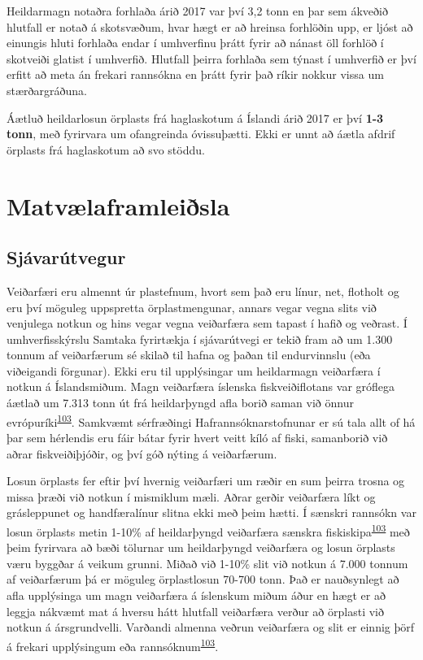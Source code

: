 \documentclass[icelandic,]{book}
\begin{document}
Heildarmagn notaðra forhlaða árið 2017 var því 3,2 tonn en þar sem ákveðið hlutfall er notað á skotsvæðum, hvar hægt er að hreinsa forhlöðin upp, er ljóst að einungis hluti forhlaða endar í umhverfinu þrátt fyrir að nánast öll forhlöð í skotveiði glatist í umhverfið. Hlutfall þeirra forhlaða sem týnast í umhverfið er því erfitt að meta án frekari rannsókna en þrátt fyrir það ríkir nokkur vissa um stærðargráðuna.

Áætluð heildarlosun örplasts frá haglaskotum á Íslandi árið 2017 er því \textbf{1-3 tonn}, með fyrirvara um ofangreinda óvissuþætti. Ekki er unnt að áætla afdrif örplasts frá haglaskotum að svo stöddu.

\hypertarget{matvlaframleisla}{%
\section*{Matvælaframleiðsla}\label{matvlaframleisla}}

\hypertarget{sjavarutvegur}{%
\subsection*{Sjávarútvegur}\label{sjavarutvegur}}

Veiðarfæri eru almennt úr plastefnum, hvort sem það eru línur, net, flotholt og eru því möguleg uppspretta örplastmengunar, annars vegar vegna slits við venjulega notkun og hins vegar vegna veiðarfæra sem tapast í hafið og veðrast. Í umhverfisskýrslu Samtaka fyrirtækja í sjávarútvegi er tekið fram að um 1.300 tonnum af veiðarfærum sé skilað til hafna og þaðan til endurvinnslu (eða viðeigandi förgunar). Ekki eru til upplýsingar um heildarmagn veiðarfæra í notkun á Íslandsmiðum. Magn veiðarfæra íslenska fiskveiðiflotans var gróflega áætlað um 7.313 tonn út frá heildarþyngd afla borið saman við önnur evrópuríki\textsuperscript{\protect\hyperlink{ref-Hann2018}{103}}. Samkvæmt sérfræðingi Hafrannsóknarstofnunar er sú tala allt of há þar sem hérlendis eru fáir bátar fyrir hvert veitt kíló af fiski, samanborið við aðrar fiskveiðiþjóðir, og því góð nýting á veiðarfærum.

Losun örplasts fer eftir því hvernig veiðarfæri um ræðir en sum þeirra trosna og missa þræði við notkun í mismiklum mæli. Aðrar gerðir veiðarfæra líkt og grásleppunet og handfæralínur slitna ekki með þeim hætti. Í sænskri rannsókn var losun örplasts metin 1-10\% af heildarþyngd veiðarfæra sænskra fiskiskipa\textsuperscript{\protect\hyperlink{ref-Hann2018}{103}} með þeim fyrirvara að bæði tölurnar um heildarþyngd veiðarfæra og losun örplasts væru byggðar á veikum grunni. Miðað við 1-10\% slit við notkun á 7.000 tonnum af veiðarfærum þá er möguleg örplastlosun 70-700 tonn. Það er nauðsynlegt að afla upplýsinga um magn veiðarfæra á íslenskum miðum áður en hægt er að leggja nákvæmt mat á hversu hátt hlutfall veiðarfæra verður að örplasti við notkun á ársgrundvelli. Varðandi almenna veðrun veiðarfæra og slit er einnig þörf á frekari upplýsingum eða rannsóknum\textsuperscript{\protect\hyperlink{ref-Hann2018}{103}}.
\end{document}
